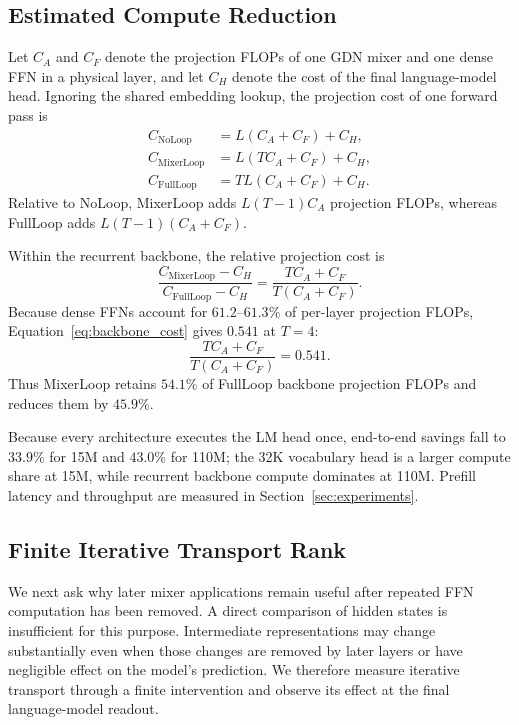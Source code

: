 \documentclass{article}
\begin{document}
\subsection{Estimated Compute Reduction}

Let $C_A$ and $C_F$ denote the projection FLOPs of
one GDN mixer and one dense FFN in a physical layer, and let $C_H$ denote the
cost of the final language-model head. Ignoring the shared embedding lookup,
the projection cost of one forward pass is
\begin{align}
C_{\mathrm{NoLoop}}
&=
L(C_A+C_F)+C_H,\\
C_{\mathrm{MixerLoop}}
&=
L(TC_A+C_F)+C_H,\\
C_{\mathrm{FullLoop}}
&=
TL(C_A+C_F)+C_H.
\end{align}
Relative to NoLoop, MixerLoop adds $L(T-1)C_A$ projection FLOPs, whereas
FullLoop adds $L(T-1)(C_A+C_F)$.

Within the recurrent backbone, the relative projection cost is
\begin{equation}
\frac{
C_{\mathrm{MixerLoop}}-C_H
}{
C_{\mathrm{FullLoop}}-C_H
}
=
\frac{TC_A+C_F}{T(C_A+C_F)}.
\label{eq:backbone_cost}
\end{equation}
Because dense FFNs account for $61.2$--$61.3\%$ of per-layer projection FLOPs,
Equation~\ref{eq:backbone_cost} gives $0.541$ at $T=4$:
\begin{equation}
\frac{TC_A+C_F}{T(C_A+C_F)}
=0.541.
\end{equation}
Thus MixerLoop retains $54.1\%$ of FullLoop backbone projection FLOPs and
reduces them by $45.9\%$.

Because every architecture executes the LM head once, end-to-end savings fall
to $33.9\%$ for 15M and $43.0\%$ for 110M; the 32K vocabulary head is a larger
compute share at 15M, while recurrent backbone compute dominates at 110M.
Prefill latency and throughput are measured in Section~\ref{sec:experiments}.

\subsection{Finite Iterative Transport Rank}
\label{sec:finite_itr}

We next ask why later mixer applications remain useful after repeated FFN computation has been removed. A direct
comparison of hidden states is insufficient for this purpose. Intermediate
representations may change substantially even when those changes are removed
by later layers or have negligible effect on the model's prediction. We
therefore measure iterative transport through a finite intervention and observe
its effect at the final language-model readout.
\end{document}
